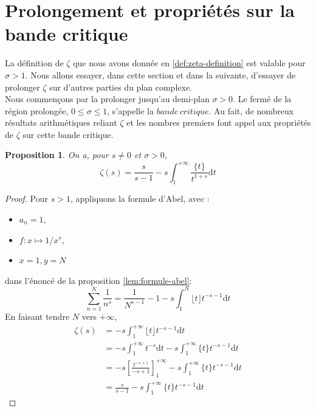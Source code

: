\documentclass[french]{report}
\newtheorem{proposition}[theorem]{Proposition}
\begin{document}
\section{Prolongement et propriétés sur la bande critique}\label{section:prolongement-proprietes-bande-critique}

La définition de $\zeta$ que nous avons donnée en \ref{def:zeta-definition} est valable pour $\sigma>1$. Nous allons essayer, dans cette section et dans la suivante, d'essayer de prolonger $\zeta$ sur d'autres parties du plan complexe.
\\

Nous commençons par la prolonger jusqu'au demi-plan $\sigma>0$. Le fermé de la région prolongée, $0\leq\sigma\leq1$, s'appelle la $bande\,critique$. Au fait, de nombreux résultats arithmétiques reliant $\zeta$ et les nombres premiers font appel aux propriétés de $\zeta$ sur cette bande critique.

\begin{proposition} On a, pour $s\neq0$ et $\sigma>0$,
  \[ \zeta(s) = \frac{s}{s-1}-s\int_1^{+\infty}\frac{\{t\}}{t^{1+s}}\mathrm{d}t \]
\end{proposition}

\begin{proof}
  Pour $s>1$, appliquons la formule d'Abel, avec :
  \begin{itemize}
    \item $a_n=1$,
    \item $f:x\mapsto 1/x^s$,
    \item $x=1, y=N$
  \end{itemize}
  dans l'énoncé de la proposition \ref{lem:formule-abel}:
  \[
    \sum_{n=1}^N\frac{1}{n^s}
    = \frac{1}{N^{s-1}} - 1 - s\int_1^N\lfloor t\rfloor t^{-s-1}\mathrm{d}t
  \]
  En faisant tendre $N$ vers $+\infty$,
  \begin{align*}
    \zeta(s)
    &= - s\int_1^{+\infty}\lfloor t\rfloor t^{-s-1}\mathrm{d}t \\
    &= - s\int_1^{+\infty} t^{-s}\mathrm{d}t - s\int_1^{+\infty} \{t\}t^{-s-1}\mathrm{d}t \\
    &= -s\left[\frac{t^{-s+1}}{-s+1}\right]_1^{+\infty} - s\int_1^{+\infty} \{t\}t^{-s-1}\mathrm{d}t \\
    &= \frac{s}{s-1} - s\int_1^{+\infty} \{t\}t^{-s-1}\mathrm{d}t
  \end{align*}
\end{proof}
\end{document}
